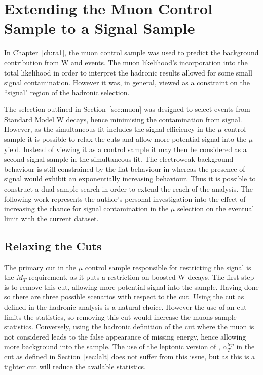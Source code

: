 \chapter{Extending the Muon Control Sample to a Signal Sample}
\label{ch:ra4}

In Chapter~\ref{ch:ra1}, the muon control sample was used to predict the background contribution from W and \tto events. The muon likelihood's incorporation into the total likelihood in order to interpret the hadronic results allowed for some small signal contamination. However it was, in general, viewed as a constraint on the ``signal" region of the hadronic selection. 

The selection outlined in Section~\ref{sec:muon} was designed to select events from Standard Model W decays, hence minimising the contamination from signal. However, as the simultaneous fit includes the signal efficiency in the $\mu$ control sample it is possible to relax the cuts and allow more potential signal into the $\mu$ yield. Instead of viewing it as a control sample it may then be considered as a second signal sample in the simultaneous fit. The electroweak background behaviour is still constrained by the flat behaviour in \RaT whereas the presence of signal would exhibit an exponentially increasing behaviour. Thus it is possible to construct a dual-sample search in order to extend the reach of the analysis.  The following work represents the author's personal investigation into the effect of increasing the chance for signal contamination in the $\mu$ selection on the eventual limit with the current dataset. 

\section{Relaxing the Cuts}

The primary cut in the $\mu$ control sample responsible for restricting the signal is the $M_{T}$ requirement, as it puts a restriction on boosted W decays. The first step is to remove this cut, allowing more potential signal into the sample. Having done so there are three possible scenarios with respect to the \alt cut. Using the \alt cut as defined in the hadronic analysis is a natural choice. However the use of an \alt cut limits the statistics, so removing this cut would increase the muons sample statistics. Conversely, using the hadronic definition of the \alt cut where the muon is not considered leads to the false appearance of missing energy, hence allowing more background into the sample. The use of the leptonic version of \alt, $\alpha^{lep}_{T}$ in the cut as defined in Section~\ref{sec:lalt} does not suffer from this issue, but as this is a tighter cut will reduce the available statistics. 

